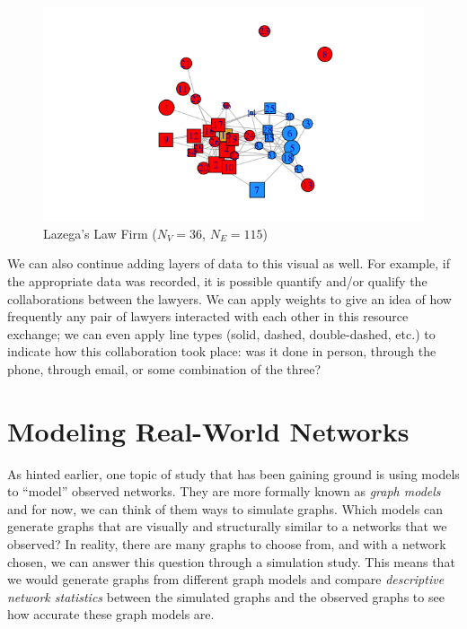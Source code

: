 \documentclass[12pt,twoside]{amherstthesis}
\begin{document}
  \begin{figure}[htbp]
  \centering
  \includegraphics{figure/02lawyerplot.png}
  \caption{Lazega's Law Firm (\(N_V = 36\), \(N_E = 115\))}
  \end{figure}
  
  We can also continue adding layers of data to this visual as well. For
  example, if the appropriate data was recorded, it is possible quantify
  and/or qualify the collaborations between the lawyers. We can apply
  weights to give an idea of how frequently any pair of lawyers interacted
  with each other in this resource exchange; we can even apply line types
  (solid, dashed, double-dashed, etc.) to indicate how this collaboration
  took place: was it done in person, through the phone, through email, or
  some combination of the three?
  
  \section{Modeling Real-World
  Networks}\label{modeling-real-world-networks}
  
  As hinted earlier, one topic of study that has been gaining ground is
  using models to ``model'' observed networks. They are more formally
  known as \emph{graph models} and for now, we can think of them ways to
  simulate graphs. Which models can generate graphs that are visually and
  structurally similar to a networks that we observed? In reality, there
  are many graphs to choose from, and with a network chosen, we can answer
  this question through a simulation study. This means that we would
  generate graphs from different graph models and compare
  \emph{descriptive network statistics} between the simulated graphs and
  the observed graphs to see how accurate these graph models are.
  
\end{document}
